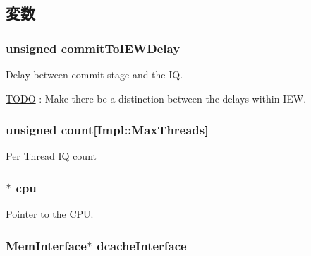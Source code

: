 \subsection{変数}
\hypertarget{classInstQueue_a92c8d68d5f0e17758f89daa2647196f5}{
\subsubsection[{commitToIEWDelay}]{\setlength{\rightskip}{0pt plus 5cm}unsigned {\bf commitToIEWDelay}}}
\label{classInstQueue_a92c8d68d5f0e17758f89daa2647196f5}
Delay between commit stage and the IQ. \begin{Desc}
\item[\hyperlink{todo__todo000043}{TODO}]: Make there be a distinction between the delays within IEW. \end{Desc}
\hypertarget{classInstQueue_ac638062ba1de6609f143c5ee3a601109}{
\subsubsection[{count}]{\setlength{\rightskip}{0pt plus 5cm}unsigned {\bf count}\mbox{[}Impl::MaxThreads\mbox{]}}}
\label{classInstQueue_ac638062ba1de6609f143c5ee3a601109}
Per Thread IQ count \hypertarget{classInstQueue_a766385c2941cd46525f4d9dff90200a2}{
\subsubsection[{cpu}]{$\ast$ {\bf cpu}}}
\label{classInstQueue_a766385c2941cd46525f4d9dff90200a2}
Pointer to the CPU. \hypertarget{classInstQueue_a22dc8294eecb144fbdd951d2e32e9330}{
\subsubsection[{dcacheInterface}]{\setlength{\rightskip}{0pt plus 5cm}MemInterface$\ast$ {\bf dcacheInterface}}}
